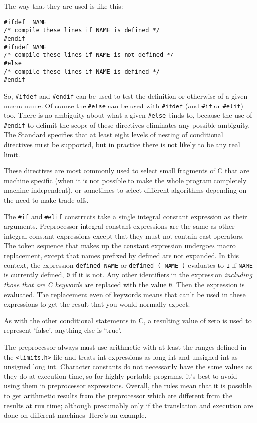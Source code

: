    The way that they are used is like this:


   \begin{Verbatim}
#ifdef  NAME
/* compile these lines if NAME is defined */
#endif
#ifndef NAME
/* compile these lines if NAME is not defined */
#else
/* compile these lines if NAME is defined */
#endif
\end{Verbatim}

   So, \texttt{\#ifdef} and \texttt{\#endif} can be used to test
    the definition or otherwise of a given macro name. Of course the
    \texttt{\#else} can be used with \texttt{\#ifdef} (and
    \texttt{\#if} or \texttt{\#elif}) too. There is no ambiguity about
    what a given \texttt{\#else} binds to, because the use of
    \texttt{\#endif} to delimit the scope of these directives eliminates
    any possible ambiguity. The Standard specifies that at least eight
    levels of nesting of conditional directives must be supported, but in
    practice there is not likely to be any real limit.


   These directives are most commonly used to select small fragments of
    C that are machine specific (when it is not possible to make the whole
    program completely machine independent), or sometimes to select
    different algorithms depending on the need to make trade-offs.


   The \texttt{\#if} and \texttt{\#elif} constructs take a single
    integral constant expression as their arguments. Preprocessor integral
    constant expressions are the same as other integral constant expressions
    except that they must not contain cast operators. The token sequence
    that makes up the constant expression undergoes macro replacement,
    except that names prefixed by defined are not expanded. In this context,
    the expression \texttt{defined NAME} or \texttt{defined ( NAME
    )} evaluates to \texttt{1} if \texttt{NAME} is currently
    defined, \texttt{0} if it is not. Any other identifiers in the
    expression \textit{including those that are C keywords} are replaced
    with the value \texttt{0}. Then the expression is evaluated. The
    replacement even of keywords means that \sizeof{} can't be
    used in these expressions to get the result that you would normally
    expect.


   As with the other conditional statements in C, a resulting value of
    zero is used to represent `false', anything else is
    `true'.


   The preprocessor always must use arithmetic with at least the ranges
    defined in the \texttt{<limits.h>} file and treats int
    expressions as long int and unsigned int as unsigned long int. Character
    constants do not necessarily have the same values as they do at
    execution time, so for highly portable programs, it's best to avoid
    using them in preprocessor expressions. Overall, the rules mean that it
    is possible to get arithmetic results from the preprocessor which are
    different from the results at run time; although presumably only if the
    translation and execution are done on different machines. Here's an
    example.


